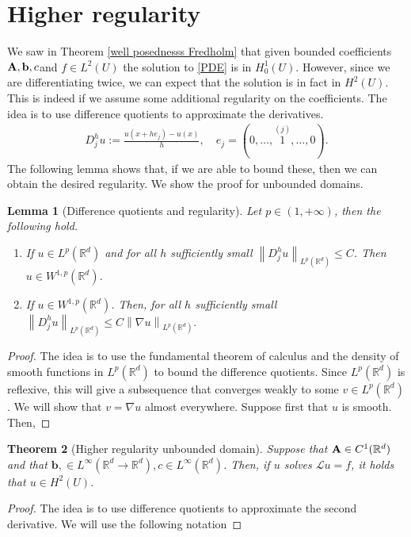 \documentclass[
    a4paper,
    DIV=14,
    abstract=true,
    numbers=noenddot
]
{scrartcl}
\newtheorem{theorem}{Theorem}[section]
\newtheorem{lemma}[theorem]{Lemma}
\theoremstyle{definition}
\renewcommand{\norm}[1]{\left\lVert #1 \right\rVert}\renewcommand{\abs}[1]{\left| #1 \right|}
\newcommand{\R}{\mathbb{R}}
\newcommand{\Ll}{\mathcal{L}}
\begin{document}
\section{Higher regularity}
We saw in Theorem \ref{well posednesss Fredholm} that given bounded coefficients $\vb{A},\vb{b},c$and $f \in L^2(U)$ the solution to \eqref{PDE} is in $H_0^1(U)$. However, since we are differentiating twice, we can expect that the solution is in fact in $H^2(U)$. This is indeed if we assume some additional regularity on the coefficients. The idea is to use difference quotients to approximate the derivatives.
\begin{align*}
    D_j^h u := \frac{u(x+ he_j)-u(x)}{h},\quad   e_j=(0,\ldots,\overset{(j)}{1},\ldots,0).
\end{align*}
The following lemma shows that, if we are able to bound these, then we can obtain the desired regularity. We show the proof for unbounded domains.
\begin{lemma}[Difference quotients and regularity]
    Let  $p \in (1, +\infty)$, then the following hold.
    \begin{enumerate}
        \item 	If $u \in L^p(\R^d)$ and for all $h$ sufficiently small $\norm{D_j^h u}_{L^p(\R^d)} \leq C$. Then $u \in W^{1,p}(\R^d)$.
        \item  If $u \in W^{1,p}(\R^d)$. Then, for all $h$ sufficiently small $\norm{D_j^h u}_{L^p(\R^d)} \leq C\norm{\nabla u}_{L^p(\R^d)}.$
    \end{enumerate}
\end{lemma}
\begin{proof}
    The idea is to use the fundamental theorem of calculus and the density of smooth functions in $L^p(\R^d)$  to bound the difference quotients. Since $L^p(\R^d)$ is reflexive, this will give a subsequence that converges weakly to some $v \in L^p(\R^d)$. We will show that $v=\nabla u$ almost everywhere.  Suppose first that $u$ is smooth. Then,

\end{proof}


\begin{theorem}[Higher regularity unbounded domain]
    Suppose that $\vb{A}\in C^1(\R^d)$ and that $\bm{b},  \in L^\infty(\R^d \to \R^d), c \in L^\infty(\R^d)$. Then, if $u$ solves $\Ll u=f$, it holds that $u \in H^2(U)$.
\end{theorem}
\begin{proof}
    The idea is to use difference quotients to approximate the second derivative. We will use the following notation
\end{proof}
\end{document}
